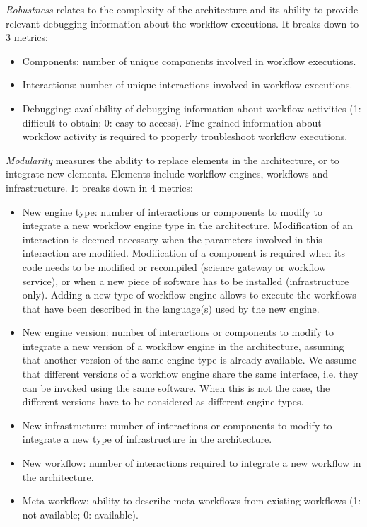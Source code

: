 \documentclass[preprint,3p,twocolumn]{elsarticle}
\begin{document}
\emph{Robustness} relates to the complexity of the architecture and
its ability to provide relevant debugging information about the
workflow executions. It breaks down to 3 metrics:
\begin{itemize}[itemsep=0cm]
\item Components: number of unique components involved in workflow executions.
\item Interactions: number of unique interactions involved in workflow executions. 
\item Debugging: availability of debugging information about workflow
  activities (1: difficult to obtain; 0: easy to access). Fine-grained
  information about workflow activity is required to properly
  troubleshoot workflow executions.
\end{itemize}

\emph{Modularity} measures the ability to replace elements in the
architecture, or to integrate new elements. Elements include
workflow engines, workflows and infrastructure. It breaks down in 4
metrics:
\begin{itemize}[itemsep=0cm]
\item New engine type: number of interactions or components to modify
  to integrate a new workflow engine type in the
  architecture. Modification of an interaction is deemed necessary
  when the parameters involved in this interaction are
  modified. Modification of a component is required when its code
  needs to be modified or recompiled (science gateway or workflow
  service), or when a new piece of software has to be installed
  (infrastructure only). Adding a new type of workflow engine allows
  to execute the workflows that have been described in the language(s)
  used by the new engine.
\item New engine version: number of interactions or components to
  modify to integrate a new version of a workflow engine in the
  architecture, assuming that another version of the same engine type
  is already available. We assume that different versions of a
  workflow engine share the same interface, i.e. they can be invoked
  using the same software. When this is not the case, the different
  versions have to be considered as different engine types. 
\item New infrastructure: number of interactions or components to
  modify to integrate a new type of infrastructure in the
  architecture.
\item New workflow: number of interactions required to integrate a new
  workflow in the architecture.
\item Meta-workflow: ability to describe meta-workflows from existing
  workflows (1: not available; 0: available).
\end{itemize}
\end{document}
